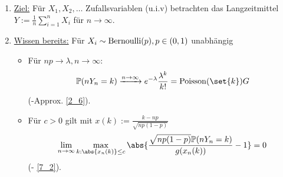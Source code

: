 ﻿%
\begin{enumerate}[label=]
	\item \ul{Ziel:} Für $X_1, X_2, \dots$ Zufallsvariablen (u.i.v) betrachten das Langzeitmittel $Y:= \frac{1}{n} \sum_{i=1}^n X_i$ für $n \to \infty$.
	\item  \ul{Wissen bereits:} Für $X_i \sim \operatorname{Bernoulli}(p), p \in (0,1)$ unabhängig
	\begin{itemize}
		\item Für $np \to \lambda, n \to \infty$:
		\begin{align*}
			\P(n Y_n = k) \xrightarrow{n \to \infty} e^{-\lambda}\frac{\lambda^k}{k!} = \Pois(\set{k}) 
G		\end{align*}
		(-Approx. \cref{2_6}).
		\item Für $c > 0$ gilt mit $x(k) := \frac{k-np}{\sqrt{np(1-p)}}$
		\begin{align*}
			\lim_{n\to \infty} \max_{k: \abs{x_n(k)} \le c} \abs{\frac{\sqrt{np(1-p)}\P(nY_n = k)}{g(x_n(k))} -1} = 0
		\end{align*}
		(- \cref{7_2}).
	\end{itemize}
\end{enumerate}

